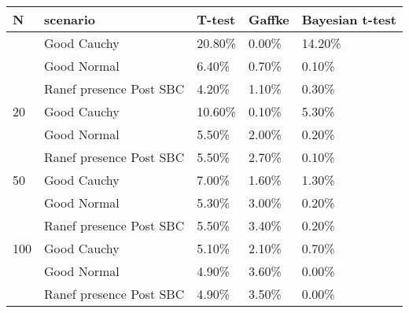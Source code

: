 \documentclass[
  letterpaper,
  DIV=11,
  numbers=noendperiod]{scrartcl}
\begin{document}
\begin{figure}


\caption{\label{fig-dap-probs}}

\end{figure}%

\begin{longtable}[]{@{}lllll@{}}
\toprule\noalign{}
N & scenario & T-test & Gaffke & Bayesian t-test \\
\midrule\noalign{}
\endhead
\bottomrule\noalign{}
\endlastfoot
10 & Good Cauchy & 20.80\% & 0.00\% & 14.20\% \\
& Good Normal & 6.40\% & 0.70\% & 0.10\% \\
& Ranef presence Post SBC & 4.20\% & 1.10\% & 0.30\% \\
20 & Good Cauchy & 10.60\% & 0.10\% & 5.30\% \\
& Good Normal & 5.50\% & 2.00\% & 0.20\% \\
& Ranef presence Post SBC & 5.50\% & 2.70\% & 0.10\% \\
50 & Good Cauchy & 7.00\% & 1.60\% & 1.30\% \\
& Good Normal & 5.30\% & 3.00\% & 0.20\% \\
& Ranef presence Post SBC & 5.50\% & 3.40\% & 0.20\% \\
100 & Good Cauchy & 5.10\% & 2.10\% & 0.70\% \\
& Good Normal & 4.90\% & 3.60\% & 0.00\% \\
& Ranef presence Post SBC & 4.90\% & 3.50\% & 0.00\% \\
\end{longtable}
\end{document}
